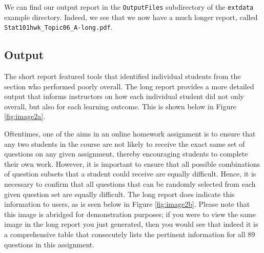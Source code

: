 \documentclass[11pt,a4paper,oldfontcommands,openany]{memoir}
\numberwithin{equation}{section} %
\begin{document}
We can find our output report in the \texttt{OutputFiles} subdirectory of the \texttt{extdata} example directory. Indeed, we see that we now have a much longer report, called \texttt{Stat101hwk\_Topic06\_A-long.pdf}.

\subsection{Output}

The short report featured tools that identified individual students from the section who performed poorly overall. The long report provides a more detailed output that informs instructors on how each individual student did not only overall, but also for each learning outcome. This is shown below in Figure \ref{fig:image2a}.

\begin{center}
\captionsetup{width=0.75\textwidth}
\label{fig:image2a}
\end{center}

Oftentimes, one of the aims in an online homework assignment is to ensure that any two students in the course are not likely to receive the exact same set of questions on any given assignment, thereby encouraging students to complete their own work. However, it is important to ensure that all possible combinations of question subsets that a student could receive are equally difficult. Hence, it is necessary to confirm that all questions that can be randomly selected from each given question set are equally difficult. The long report does indicate this information to users, as is seen below in Figure \ref{fig:image2b}. Please note that this image is abridged for demonstration purposes; if you were to view the same image in the long report you just generated, then you would see that indeed it is a comprehensive table that consecutely lists the pertinent information for all 89 questions in this assignment. 
\end{document}
